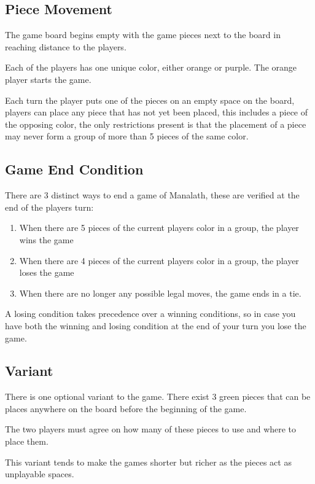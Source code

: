 \documentclass[12pt]{article}
\begin{document}
\subsection{Piece Movement}
\hspace{0.6cm}
  The game board begins empty with the game pieces next to the board
  in reaching distance to the players.

  Each of the players has one unique color, either orange or purple. The orange
  player starts the game.

  Each turn the player puts one of the pieces on an empty space on the board, players can
  place any piece that has not yet been placed, this includes a piece of the opposing
  color, the only restrictions present is that the placement of a piece may never
  form a group of more than 5 pieces of the same color.
\subsection{Game End Condition}
\hspace{0.6cm}
  There are 3 distinct ways to end a game of Manalath, these are verified
  at the end of the players turn:
  \begin{enumerate}
    \item When there are 5 pieces of the current players color in a group, the player wins the game
    \item When there are 4 pieces of the current players color in a group, the player loses the game
    \item When there are no longer any possible legal moves, the game ends in a tie.
  \end{enumerate}

A losing condition takes precedence over a winning conditions,
so in case you have both the winning and losing condition at the end of your turn
you lose the game.
\subsection{Variant}
\hspace{0.6cm}
There is one optional variant to the game. There exist 3 green pieces that can
be places anywhere on the board before the beginning of the game.

The two players must agree on how many of these pieces to use and where to place
them.

This variant tends to make the games shorter but richer as the pieces act as
unplayable spaces.
\end{document}
